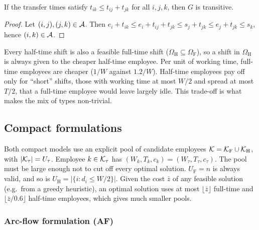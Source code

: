 \begin{proposition}\label{prop:transitive}
If the transfer times satisfy $t_{ik}\le t_{ij}+t_{jk}$ for all $i,j,k$, then
$G$ is transitive.
\end{proposition}
\begin{proof}
Let $(i,j),(j,k)\in\mathcal{A}$. Then
$e_i+t_{ik}\le e_i+t_{ij}+t_{jk}\le s_j+t_{jk}\le e_j+t_{jk}\le s_k$,
hence $(i,k)\in\mathcal{A}$.
\end{proof}

\begin{remark}
Every half-time shift is also a feasible full-time shift
($\Omega_{\mathrm H}\subseteq\Omega_{\mathrm F}$), so a shift in
$\Omega_{\mathrm H}$ is always given to the cheaper half-time employee. Per
unit of working time, full-time employees are cheaper ($1/W$ against
$1.2/W$). Half-time employees pay off only for ``short'' shifts, those with
working time at most $W/2$ and spread at most $T/2$, that a full-time employee
would leave largely idle. This trade-off is what makes the mix of types
non-trivial.
\end{remark}

\subsection{Compact formulations}
\label{sec:compact}

Both compact models use an explicit pool of candidate employees
$\mathcal{K}=\mathcal{K}_{\mathrm F}\cup\mathcal{K}_{\mathrm H}$, with $|\mathcal{K}_\tau|=U_\tau$. Employee
$k\in\mathcal{K}_\tau$ has $(W_k,T_k,c_k)=(W_\tau,T_\tau,c_\tau)$. The pool must be
large enough not to cut off every optimal solution. $U_{\mathrm F}=n$ is
always valid, and so is $U_{\mathrm H}=|\{i:d_i\le W/2\}|$. Given the cost
$\bar z$ of any feasible solution (e.g.\ from a greedy heuristic), an optimal
solution uses at most $\lfloor\bar z\rfloor$ full-time and
$\lfloor\bar z/0.6\rfloor$ half-time employees, which gives much smaller
pools.

\subsubsection{Arc-flow formulation (AF)}

